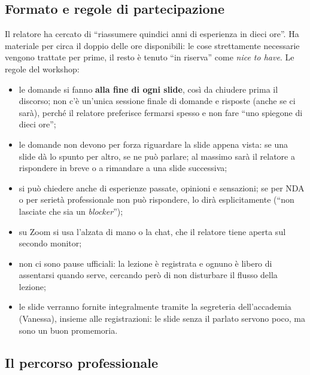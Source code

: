 \subsection{Formato e regole di partecipazione}

Il relatore ha cercato di ``riassumere quindici anni di esperienza in dieci
ore''. Ha materiale per circa il doppio delle ore disponibili: le cose
strettamente necessarie vengono trattate per prime, il resto è tenuto ``in
riserva'' come \emph{nice to have}. Le regole del workshop:
\begin{itemize}
  \item le domande si fanno \textbf{alla fine di ogni slide}, così da chiudere
        prima il discorso; non c'è un'unica sessione finale di domande e
        risposte (anche se ci sarà), perché il relatore preferisce fermarsi
        spesso e non fare ``uno spiegone di dieci ore'';
  \item le domande non devono per forza riguardare la slide appena vista: se
        una slide dà lo spunto per altro, se ne può parlare; al massimo sarà
        il relatore a rispondere in breve o a rimandare a una slide
        successiva;
  \item si può chiedere anche di esperienze passate, opinioni e sensazioni;
        se per NDA o per serietà professionale non può rispondere, lo dirà
        esplicitamente (``non lasciate che sia un \emph{blocker}'');
  \item su Zoom si usa l'alzata di mano o la chat, che il relatore tiene
        aperta sul secondo monitor;
  \item non ci sono pause ufficiali: la lezione è registrata e ognuno è
        libero di assentarsi quando serve, cercando però di non disturbare il
        flusso della lezione;
  \item le slide verranno fornite integralmente tramite la segreteria
        dell'accademia (Vanessa), insieme alle registrazioni: le slide senza
        il parlato servono poco, ma sono un buon promemoria.
\end{itemize}

\subsection{Il percorso professionale}


